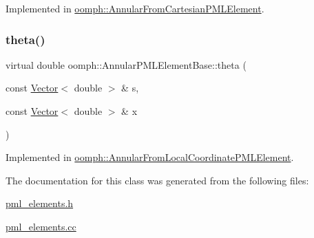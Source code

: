 Implemented in \hyperlink{classoomph_1_1AnnularFromCartesianPMLElement_acb66a5412d96aef573a498ffc8f7a72d}{oomph\+::\+Annular\+From\+Cartesian\+P\+M\+L\+Element}.

\mbox{\label{classoomph_1_1AnnularPMLElementBase_a74036190f87f79129cdcda562664dd18}} 
\subsubsection{\texorpdfstring{theta()}{theta()}}
{\footnotesize\ttfamily virtual double oomph\+::\+Annular\+P\+M\+L\+Element\+Base\+::theta (\begin{DoxyParamCaption}\item[{const \hyperlink{classoomph_1_1Vector}{Vector}$<$ double $>$ \&}]{s,  }\item[{const \hyperlink{classoomph_1_1Vector}{Vector}$<$ double $>$ \&}]{x }\end{DoxyParamCaption})\hspace{0.3cm}{\ttfamily [pure virtual]}}



Implemented in \hyperlink{classoomph_1_1AnnularFromLocalCoordinatePMLElement_ae9f56654db4d7979163db0529d9a1408}{oomph\+::\+Annular\+From\+Local\+Coordinate\+P\+M\+L\+Element}.



The documentation for this class was generated from the following files\+:\begin{DoxyCompactItemize}
\item 
\hyperlink{pml__elements_8h}{pml\+\_\+elements.\+h}\item 
\hyperlink{pml__elements_8cc}{pml\+\_\+elements.\+cc}\end{DoxyCompactItemize}
